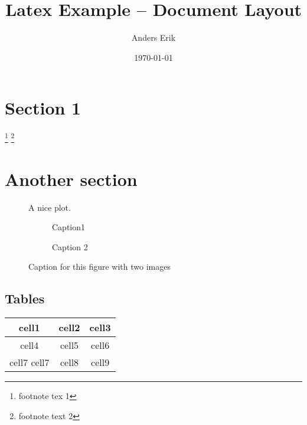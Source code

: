 \documentclass[12pt, letterpaper]{article}
\title{Latex Example -- Document Layout}
\author{Anders Erik}
\date{\today}
\begin{document}
\maketitle


\section{Section 1}

\footnote [1] { footnote tex 1 } 
\footnote [4] { footnote text 2 } 

\section{Another section}


\begin{figure}[H]
    \centering
    \caption{A nice plot.}
    \label{fig:mesh1}
\end{figure}


\begin{figure}[H]

\begin{subfigure}{0.1\textwidth}
\caption{Caption1}
\label{fig:subim1}
\end{subfigure}

\begin{subfigure}{0.4\textwidth}
\caption{Caption 2}
\label{fig:subim2}
\end{subfigure}

\caption{Caption for this figure with two images}
\label{fig:image2}

\end{figure}



\subsection{Tables}


\begin{center}
\begin{tabular}{|| c | c | c ||}
  \hline
  cell1& cell2 & cell3 \\ 
  \hline
  cell4 & cell5 & cell6 \\ 
  \hline
  cell7 \newline cell7  & cell8 & cell9 \\ 
  \hline
\end{tabular}
\end{center}
\end{document}
